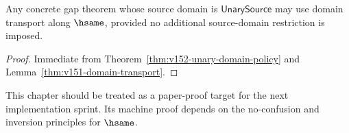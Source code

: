 \begin{corollary}
Any concrete gap theorem whose source domain is \(\mathsf{UnarySource}\) may use domain transport along \(\hsame\), provided no additional source-domain restriction is imposed.
\end{corollary}

\begin{proof}
Immediate from Theorem~\ref{thm:v152-unary-domain-policy} and Lemma~\ref{thm:v151-domain-transport}.
\end{proof}

\begin{remark}
This chapter should be treated as a paper-proof target for the next implementation sprint. Its machine proof depends on the no-confusion and inversion principles for \(\hsame\).
\end{remark}

